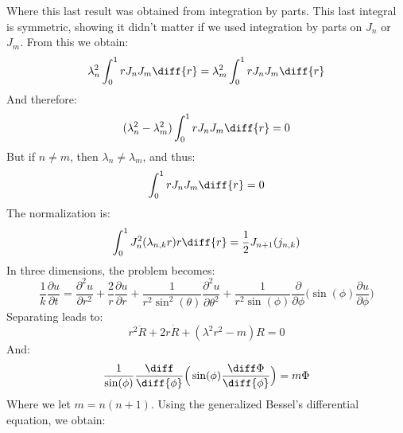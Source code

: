 \documentclass[crop=false,class=book,oneside]{standalone}
\begin{document}
            Where this last result was obtained from integration
            by parts. This last integral is symmetric, showing
            it didn't matter if we used integration by parts on
            $J_{n}$ or $J_{m}$. From this we obtain:
            \begin{equation}
                \lambda_{n}^{2}\int_{0}^{1}rJ_{n}J_{m}\diff{r}
                =\lambda_{m}^{2}\int_{0}^{1}rJ_{n}J_{m}\diff{r}
            \end{equation}
            And therefore:
            \begin{equation}
                (\lambda_{n}^{2}-\lambda_{m}^{2})
                \int_{0}^{1}rJ_{n}J_{m}\diff{r}=0
            \end{equation}
            But if $n\ne{m}$, then $\lambda_{n}\ne\lambda_{m}$,
            and thus:
            \begin{equation}
                \int_{0}^{1}rJ_{n}J_{m}\diff{r}=0
            \end{equation}
            The normalization is:
            \begin{equation}
                \int_{0}^{1}J_{n}^{2}(\lambda_{n,k}r)r\diff{r}=
                \frac{1}{2}J_{n+1}(j_{n,k})
            \end{equation}
            In three dimensions, the problem becomes:
            \begin{equation}
                \frac{1}{k}\frac{\partial{u}}{\partial{t}}=
                \frac{\partial^{2}u}{\partial{r}^{2}}+
                \frac{2}{r}\frac{\partial{u}}{\partial{r}}+
                \frac{1}{r^{2}\sin^{2}(\theta)}
                \frac{\partial^{2}u}{\partial\theta^{2}}+
                \frac{1}{r^{2}\sin(\phi)}
                \frac{\partial}{\partial\phi}\Big(
                    \sin(\phi)\frac{\partial{u}}{\partial\phi}\Big)
            \end{equation}
            Separating leads to:
            \begin{equation}
                r^{2}\ddot{R}+2r\dot{R}+(\lambda^{2}r^{2}-m)R=0
            \end{equation}
            And:
            \begin{equation}
                \frac{1}{\sin(\phi)}\frac{\diff}{\diff{\phi}}
                    \Big(\sin(\phi)\frac{\diff\Phi}{\diff{\phi}}\Big)
                =m\Phi
            \end{equation}
            Where we let $m=n(n+1)$. Using the generalized Bessel's
            differential equation, we obtain:
\end{document}
